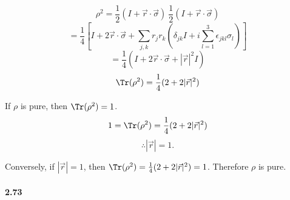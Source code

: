 $$
    \rho^2 = \frac{1}{2} (I + \vec{r} \cdot \vec{\sigma})~ \frac{1}{2} (I + \vec{r} \cdot \vec{\sigma})$$
    $$
        = \frac{1}{4} \left[ I + 2 \vec{r}\cdot \vec{\sigma} + \sum_{j,k}r_j r_k \left(\delta_{jk} I + i \sum_{l=1}^3 \epsilon_{jkl}\sigma_l \right)  \right]$$
        $$
        = \frac{1}{4} \left(I + 2 \vec{r}\cdot \vec{\sigma} + |\vec{r}|^2 I \right)$$
        $$\Tr (\rho^2) = \frac{1}{4} (2 + 2|\vec{r}|^2)$$

If $\rho$ is pure, then $\Tr (\rho^2) = 1$.
$$   1 =  \Tr (\rho^2) = \frac{1}{4} (2 + 2|\vec{r}|^2)$$
$$   \therefore |\vec{r}| = 1.$$

Conversely, if $|\vec{r}| = 1$, then $\Tr (\rho^2) = \frac{1}{4} (2 + 2|\vec{r}|^2) = 1$. Therefore $\rho$ is pure.


\paragraph{2.73} \textbf{}%
\\

